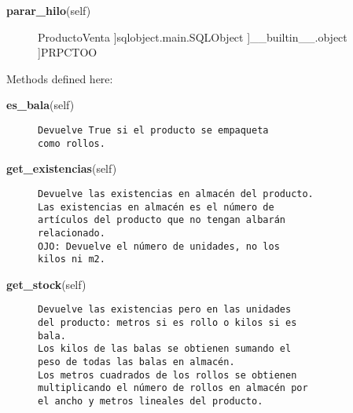 \begin{description}\item[{\bf parar\_hilo}(self)\end{description}

 \par 


~\\
class {\bf ProductoVenta}(sqlobject.main.SQLObject, PRPCTOO)
    
{\tt ~~~}~
\begin{description}\item[Method resolution order:
]ProductoVenta
]sqlobject.main.SQLObject
]\_\_builtin\_\_.object
]PRPCTOO
\end{description}

Methods defined here:\\
\begin{description}\item[{\bf es\_bala}(self)\end{description}

\begin{description}\item[{\bf es\_rollo}(self)]{\tt Devuelve~True~si~el~producto~se~empaqueta\\
como~rollos.}\end{description}

\begin{description}\item[{\bf get\_existencias}(self)]{\tt Devuelve~las~existencias~en~almacén~del~producto.\\
Las~existencias~en~almacén~es~el~número~de~\\
artículos~del~producto~que~no~tengan~albarán~\\
relacionado.\\
OJO:~Devuelve~el~número~de~unidades,~no~los\\
kilos~ni~m2.}\end{description}

\begin{description}\item[{\bf get\_stock}(self)]{\tt Devuelve~las~existencias~pero~en~las~unidades\\
del~producto:~metros~si~es~rollo~o~kilos~si~es\\
bala.\\
Los~kilos~de~las~balas~se~obtienen~sumando~el\\
peso~de~todas~las~balas~en~almacén.\\
Los~metros~cuadrados~de~los~rollos~se~obtienen\\
multiplicando~el~número~de~rollos~en~almacén~por\\
el~ancho~y~metros~lineales~del~producto.}\end{description}


